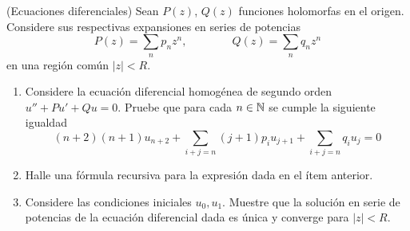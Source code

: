 \begin{exercise}
(Ecuaciones diferenciales) Sean $P(z)$, $Q(z)$ funciones holomorfas en el origen. Considere sus respectivas expansiones en series de potencias
$$P(z) = \sum_n p_n z^n, \qquad \qquad Q(z) = \sum_n q_n z^n$$
en una región común $|z| < R$.

\begin{enumerate}[label=\alph*)]
    \item Considere la ecuación diferencial homogénea de segundo orden $u'' + Pu' + Qu = 0$. Pruebe que para cada $n \in \mathbb N$ se cumple la siguiente igualdad
    $$(n+2) (n+1) u_{n+2} + \sum_{i+j=n} (j+1) p_i u_{j+1} + \sum_{i+j=n} q_i u_j = 0$$
    
    \item Halle una fórmula recursiva para la expresión dada en el ítem anterior.
    
    \item Considere las condiciones iniciales $u_0, u_1$. Muestre que la solución en serie de potencias de la ecuación diferencial dada es única y converge para $|z| < R$.
\end{enumerate}
\end{exercise}

